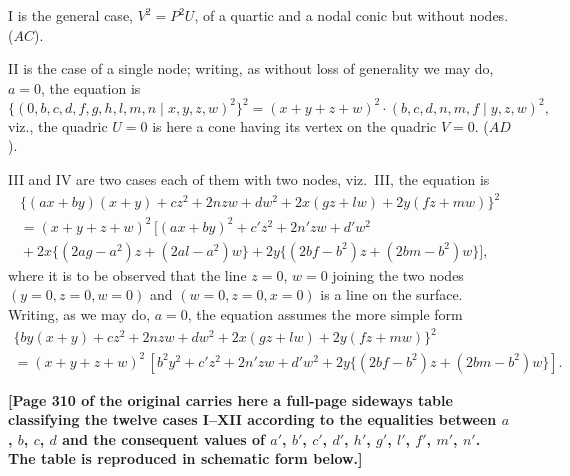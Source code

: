 \documentclass[11pt,a4paper]{article}
\providecommand{\midbar}{\mid}
\begin{document}
\medskip

I is the general case, $V^{2} = P^{2} U$, of a quartic and a nodal conic
but without nodes. \quad ($AC$).

\medskip

II is the case of a single node; writing, as without loss of generality
we may do, $a = 0$, the equation is
\[
\{(0, b, c, d, f, g, h, l, m, n\!\midbar\! x, y, z, w)^{2}\}^{2}
= (x + y + z + w)^{2} \cdot (b, c, d, n, m, f\!\midbar\! y, z, w)^{2},
\]
viz., the quadric $U = 0$ is here a cone having its vertex on the quadric
$V = 0$. \quad ($AD$).

\medskip

III and IV are two cases each of them with two nodes, viz.\ III, the
equation is
\begin{multline*}
\{(a x + b y)(x + y) + c z^{2} + 2 n z w + d w^{2}
+ 2 x (g z + l w) + 2 y (f z + m w)\}^{2}\\
= (x + y + z + w)^{2}\,
[(a x + b y)^{2} + c' z^{2} + 2 n' z w + d' w^{2}\\
{}+ 2 x \{(2 a g - a^{2}) z + (2 a l - a^{2}) w\}
{}+ 2 y \{(2 b f - b^{2}) z + (2 b m - b^{2}) w\}], \tag{$AE$}
\end{multline*}
where it is to be observed that the line $z = 0$, $w = 0$ joining the two
nodes $(y = 0, z = 0, w = 0)$ and $(w = 0, z = 0, x = 0)$ is a line on the
surface. Writing, as we may do, $a = 0$, the equation assumes the more
simple form
\begin{multline*}
\{b y (x + y) + c z^{2} + 2 n z w + d w^{2}
+ 2 x (g z + l w) + 2 y (f z + m w)\}^{2}\\
= (x + y + z + w)^{2}\,
[b^{2} y^{2} + c' z^{2} + 2 n' z w + d' w^{2}
+ 2 y \{(2 b f - b^{2}) z + (2 b m - b^{2}) w\}]. \tag{$AE$}
\end{multline*}

\medskip

\noindent\textbf{[Page 310 of the original carries here a full-page sideways
table classifying the twelve cases I--XII according to the equalities
between $a$, $b$, $c$, $d$ and the consequent values of $a'$, $b'$, $c'$,
$d'$, $h'$, $g'$, $l'$, $f'$, $m'$, $n'$. The table is reproduced in
schematic form below.]}

\medskip
\end{document}
